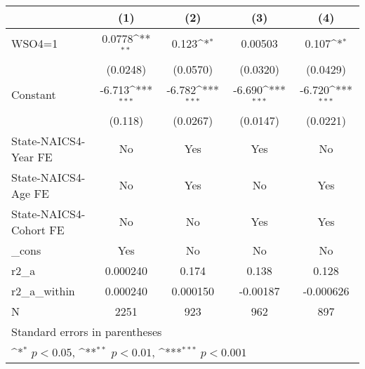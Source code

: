 {
\def\sym#1{\ifmmode^{#1}\else\(^{#1}\)\fi}
\begin{tabular}{l*{4}{c}}
\hline\hline
                    &\multicolumn{1}{c}{(1)}         &\multicolumn{1}{c}{(2)}         &\multicolumn{1}{c}{(3)}         &\multicolumn{1}{c}{(4)}         \\
\hline
WSO4=1              &      0.0778\sym{**} &       0.123\sym{*}  &     0.00503         &       0.107\sym{*}  \\
                    &    (0.0248)         &    (0.0570)         &    (0.0320)         &    (0.0429)         \\
[1em]
Constant            &      -6.713\sym{***}&      -6.782\sym{***}&      -6.690\sym{***}&      -6.720\sym{***}\\
                    &     (0.118)         &    (0.0267)         &    (0.0147)         &    (0.0221)         \\
[1em]
State-NAICS4-Year FE&          No         &         Yes         &         Yes         &          No         \\
[1em]
State-NAICS4-Age FE &          No         &         Yes         &          No         &         Yes         \\
[1em]
State-NAICS4-Cohort FE&          No         &          No         &         Yes         &         Yes         \\
[1em]
\_cons              &         Yes         &          No         &          No         &          No         \\
\hline
r2\_a                &    0.000240         &       0.174         &       0.138         &       0.128         \\
r2\_a\_within         &    0.000240         &    0.000150         &    -0.00187         &   -0.000626         \\
N                   &        2251         &         923         &         962         &         897         \\
\hline\hline
\multicolumn{5}{l}{\footnotesize Standard errors in parentheses}\\
\multicolumn{5}{l}{\footnotesize \sym{*} \(p<0.05\), \sym{**} \(p<0.01\), \sym{***} \(p<0.001\)}\\
\end{tabular}
}
